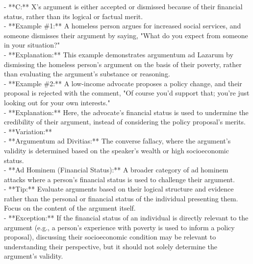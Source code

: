 \documentclass[a4paper,12pt,single,pdftex]{scrbook}
\begin{document}
    
        - **C:** X’s argument is either accepted or dismissed because of their financial status, rather than its logical or factual merit.
    \\

    
      - **Example \#1:** A homeless person argues for increased social services, and someone dismisses their argument by saying, "What do you expect from someone in your situation?"
    \\

    
      - **Explanation:** This example demonstrates argumentum ad Lazarum by dismissing the homeless person's argument on the basis of their poverty, rather than evaluating the argument’s substance or reasoning.
    \\

    
      - **Example \#2:** A low-income advocate proposes a policy change, and their proposal is rejected with the comment, "Of course you'd support that; you're just looking out for your own interests."
    \\

    
      - **Explanation:** Here, the advocate's financial status is used to undermine the credibility of their argument, instead of considering the policy proposal’s merits.
    \\

    
      - **Variation:**
    \\

    
        - **Argumentum ad Divitias:** The converse fallacy, where the argument's validity is determined based on the speaker’s wealth or high socioeconomic status.
    \\

    
        - **Ad Hominem (Financial Status):** A broader category of ad hominem attacks where a person’s financial status is used to challenge their argument.
    \\

    
      - **Tip:** Evaluate arguments based on their logical structure and evidence rather than the personal or financial status of the individual presenting them. Focus on the content of the argument itself.
    \\

    
      - **Exception:** If the financial status of an individual is directly relevant to the argument (e.g., a person’s experience with poverty is used to inform a policy proposal), discussing their socioeconomic condition may be relevant to understanding their perspective, but it should not solely determine the argument’s validity.
    \\
\end{document}
